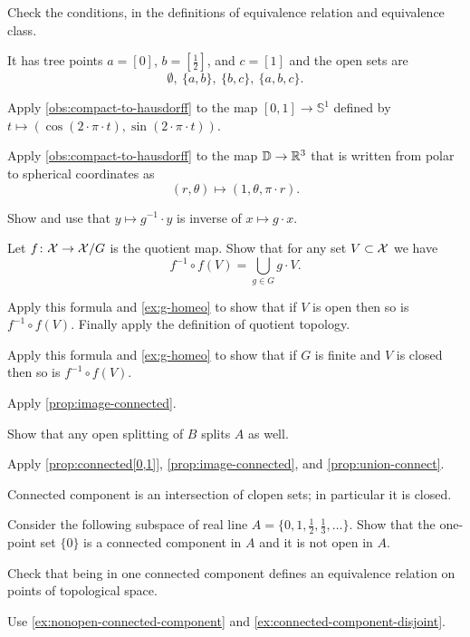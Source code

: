 \begin{multicols}{2}
Check the conditions, in the definitions of equivalence relation and equivalence class.

It has tree points $a=[0]$, $b=[\tfrac12]$, and $c=[1]$ and the open sets are 
\[\emptyset,\  \{a,b\},\ \{b,c\},\  \{a,b,c\}.\]

Apply \ref{obs:compact-to-hausdorff} to the map $[0,1]\to \mathbb{S}^1$ defined by $t\mapsto (\cos (2\cdot\pi\cdot t), \sin(2\cdot\pi\cdot t))$.

Apply \ref{obs:compact-to-hausdorff} to the map $\mathbb{D}\to \mathbb{R}^3$ that is written from polar to spherical coordinates as  
\[(r,\theta)\mapsto (1, \theta, \pi\cdot r).\]

Show and use that $y\mapsto g^{-1}\cdot y$ is inverse of $x\mapsto g\cdot x$.

\parbf{\ref{ex:quotient-map}}
Let $f\colon\mathcal{X}\to \mathcal{X}/G$ is the quotient map.
Show that for any set $V\subset \mathcal{X}$ we have
\[f^{-1}\circ f(V)=\bigcup_{g\in G}g\cdot V.\]

Apply this formula and \ref{ex:g-homeo} to show that if $V$ is open then so is $f^{-1}\circ f(V)$.
Finally apply the definition of quotient topology.

Apply this formula and \ref{ex:g-homeo} to show that if $G$ is finite and $V$ is closed then so is $f^{-1}\circ f(V)$.

 Apply \ref{prop:image-connected}.

Show that any open splitting of $B$ splits $A$ as well.

Apply \ref{prop:connected[0,1]}, \ref{prop:image-connected}, and \ref{prop:union-connect}.

Connected component is an intersection of clopen sets; in particular it is closed.

Consider the following subspace of real line $A=\{0,1,\tfrac12,\tfrac13,\dots\}$.
Show that the one-point set $\{0\}$ is a connected component in $A$ and it is not open in $A$. 

Check that being in one connected component defines an equivalence relation on points of topological space.

Use \ref{ex:nonopen-connected-component} and \ref{ex:connected-component-disjoint}.


\end{multicols}
